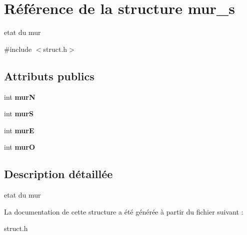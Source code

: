 \hypertarget{structmur__s}{}\section{Référence de la structure mur\+\_\+s}
\label{structmur__s}


etat du mur  




{\ttfamily \#include $<$struct.\+h$>$}

\subsection*{Attributs publics}
\begin{DoxyCompactItemize}
\item 
int {\bfseries murN}\hypertarget{structmur__s_a17fd69de75a8b0bc1975a659b235fa4a}{}\label{structmur__s_a17fd69de75a8b0bc1975a659b235fa4a}

\item 
int {\bfseries murS}\hypertarget{structmur__s_a103d980d084e67100686210daa1fa34d}{}\label{structmur__s_a103d980d084e67100686210daa1fa34d}

\item 
int {\bfseries murE}\hypertarget{structmur__s_a8c8cf029bd21f911a76a0894a61df8d6}{}\label{structmur__s_a8c8cf029bd21f911a76a0894a61df8d6}

\item 
int {\bfseries murO}\hypertarget{structmur__s_a2bd00779b370f6d650d525110c29f89b}{}\label{structmur__s_a2bd00779b370f6d650d525110c29f89b}

\end{DoxyCompactItemize}


\subsection{Description détaillée}
etat du mur 

La documentation de cette structure a été générée à partir du fichier suivant \+:\begin{DoxyCompactItemize}
\item 
struct.\+h\end{DoxyCompactItemize}
